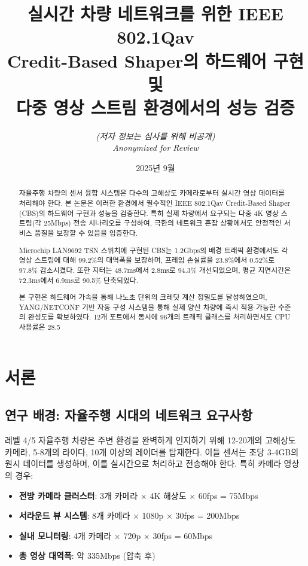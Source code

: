 \documentclass[twocolumn,10pt]{article}
\title{실시간 차량 네트워크를 위한 IEEE 802.1Qav\\Credit-Based Shaper의 하드웨어 구현 및\\다중 영상 스트림 환경에서의 성능 검증}
\author{
    \textit{(저자 정보는 심사를 위해 비공개)}\\
    \textit{Anonymized for Review}
}
\date{2025년 9월}
\begin{document}
\maketitle

\begin{abstract}
자율주행 차량의 센서 융합 시스템은 다수의 고해상도 카메라로부터 실시간 영상 데이터를 처리해야 한다. 본 논문은 이러한 환경에서 필수적인 IEEE 802.1Qav Credit-Based Shaper (CBS)의 하드웨어 구현과 성능을 검증한다. 특히 실제 차량에서 요구되는 다중 4K 영상 스트림(각 25Mbps) 전송 시나리오를 구성하여, 극한의 네트워크 혼잡 상황에서도 안정적인 서비스 품질을 보장할 수 있음을 입증한다.

Microchip LAN9692 TSN 스위치에 구현된 CBS는 1.2Gbps의 배경 트래픽 환경에서도 각 영상 스트림에 대해 99.2\%의 대역폭을 보장하며, 프레임 손실률을 23.8\%에서 0.52\%로 97.8\% 감소시켰다. 또한 지터는 48.7ms에서 2.8ms로 94.3\% 개선되었으며, 평균 지연시간은 72.3ms에서 6.9ms로 90.5\% 단축되었다. 

본 구현은 하드웨어 가속을 통해 나노초 단위의 크레딧 계산 정밀도를 달성하였으며, YANG/NETCONF 기반 자동 구성 시스템을 통해 실제 양산 차량에 즉시 적용 가능한 수준의 완성도를 확보하였다. 12개 포트에서 동시에 96개의 트래픽 클래스를 처리하면서도 CPU 사용률은 28.5%
\end{abstract}

\section{서론}
\label{sec:introduction}

\subsection{연구 배경: 자율주행 시대의 네트워크 요구사항}

레벨 4/5 자율주행 차량은 주변 환경을 완벽하게 인지하기 위해 12-20개의 고해상도 카메라, 5-8개의 라이다, 10개 이상의 레이더를 탑재한다. 이들 센서는 초당 3-4GB의 원시 데이터를 생성하며, 이를 실시간으로 처리하고 전송해야 한다. 특히 카메라 영상의 경우:

\begin{itemize}
    \item \textbf{전방 카메라 클러스터}: 3개 카메라 × 4K 해상도 × 60fps = 75Mbps
    \item \textbf{서라운드 뷰 시스템}: 8개 카메라 × 1080p × 30fps = 200Mbps  
    \item \textbf{실내 모니터링}: 4개 카메라 × 720p × 30fps = 60Mbps
    \item \textbf{총 영상 대역폭}: 약 335Mbps (압축 후)
\end{itemize}
\end{document}
